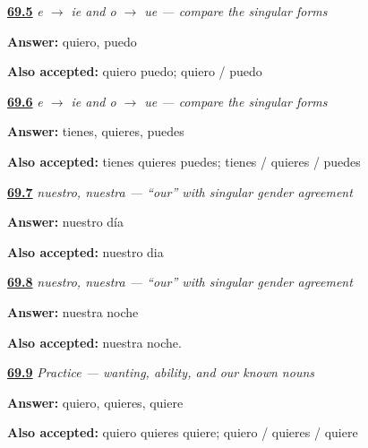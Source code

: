 \noindent\begin{minipage}[t]{\linewidth}
\raggedright
\hyperlink{review-ES-C11-stem-changes-yo-contrast}{\textbf{69.5}} \emph{e $\to$ ie and o $\to$ ue — compare the singular forms}\par
\small \textbf{Answer:} quiero, puedo\par
\footnotesize \textbf{Also accepted:} quiero puedo; quiero / puedo
\end{minipage}\par\medskip

\noindent\begin{minipage}[t]{\linewidth}
\raggedright
\hyperlink{review-ES-C11-stem-changes-tu-contrast}{\textbf{69.6}} \emph{e $\to$ ie and o $\to$ ue — compare the singular forms}\par
\small \textbf{Answer:} tienes, quieres, puedes\par
\footnotesize \textbf{Also accepted:} tienes quieres puedes; tienes / quieres / puedes
\end{minipage}\par\medskip

\noindent\begin{minipage}[t]{\linewidth}
\raggedright
\hyperlink{review-ES-C11-nuestro-our-day}{\textbf{69.7}} \emph{nuestro, nuestra — “our” with singular gender agreement}\par
\small \textbf{Answer:} nuestro día\par
\footnotesize \textbf{Also accepted:} nuestro dia
\end{minipage}\par\medskip

\noindent\begin{minipage}[t]{\linewidth}
\raggedright
\hyperlink{review-ES-C11-nuestro-our-night}{\textbf{69.8}} \emph{nuestro, nuestra — “our” with singular gender agreement}\par
\small \textbf{Answer:} nuestra noche\par
\footnotesize \textbf{Also accepted:} nuestra noche.
\end{minipage}\par\medskip

\noindent\begin{minipage}[t]{\linewidth}
\raggedright
\hyperlink{review-ES-C11-practice-querer-forms}{\textbf{69.9}} \emph{Practice — wanting, ability, and our known nouns}\par
\small \textbf{Answer:} quiero, quieres, quiere\par
\footnotesize \textbf{Also accepted:} quiero quieres quiere; quiero / quieres / quiere
\end{minipage}\par\medskip

